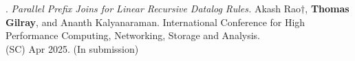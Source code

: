 \paper. \textit{Parallel Prefix Joins for Linear Recursive Datalog Rules.}
Akash Rao$\dagger$, \textbf{Thomas Gilray}, and Ananth Kalyanaraman.
International Conference for High Performance Computing, Networking, Storage and Analysis.
\\(SC) Apr 2025. (In submission)
\\ \vspace{-0.1cm}\\
